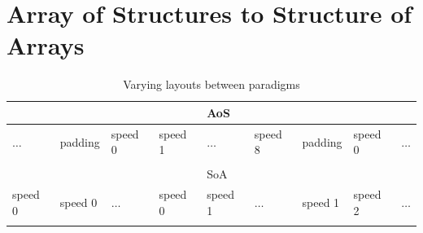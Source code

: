 \documentclass[12pt, a4paper]{article}
\begin{document}
  \section*{Array of Structures to Structure of Arrays}

  \begin{table}[ht!]
  \centering
  \vspace{-.4cm}
  \caption{Varying layouts between paradigms}
  \vspace{-.2cm}
  \label{datalayouts}
  \begin{tabular}{lllllllll}
                                &                              &                              &                              & AoS                          &                              &                              &                              &         \\ \hline
  \multicolumn{1}{l|}{$\dots$}  & \multicolumn{1}{l|}{padding} & \multicolumn{1}{l|}{speed 0} & \multicolumn{1}{l|}{speed 1} & \multicolumn{1}{l|}{$\dots$} & \multicolumn{1}{l|}{speed 8} & \multicolumn{1}{l|}{padding} & \multicolumn{1}{l|}{speed 0} & $\dots$ \\ \hline
                                &                              &                              &                              &                              &                              &                              &                              &         \\
                                &                              &                              &                              & SoA                          &                              &                              &                              &         \\ \hline
  \multicolumn{1}{|l|}{speed 0} & \multicolumn{1}{l|}{speed 0} & \multicolumn{1}{l|}{$\dots$} & \multicolumn{1}{l|}{speed 0} & \multicolumn{1}{l|}{speed 1} & \multicolumn{1}{l|}{$\dots$} & \multicolumn{1}{l|}{speed 1} & \multicolumn{1}{l|}{speed 2} & $\dots$ \\ \hline
                                &                              &                              &                              &                              &                              &                              &                              &
  \end{tabular}
  \end{table}
  \vspace{-.6cm}
\end{document}
